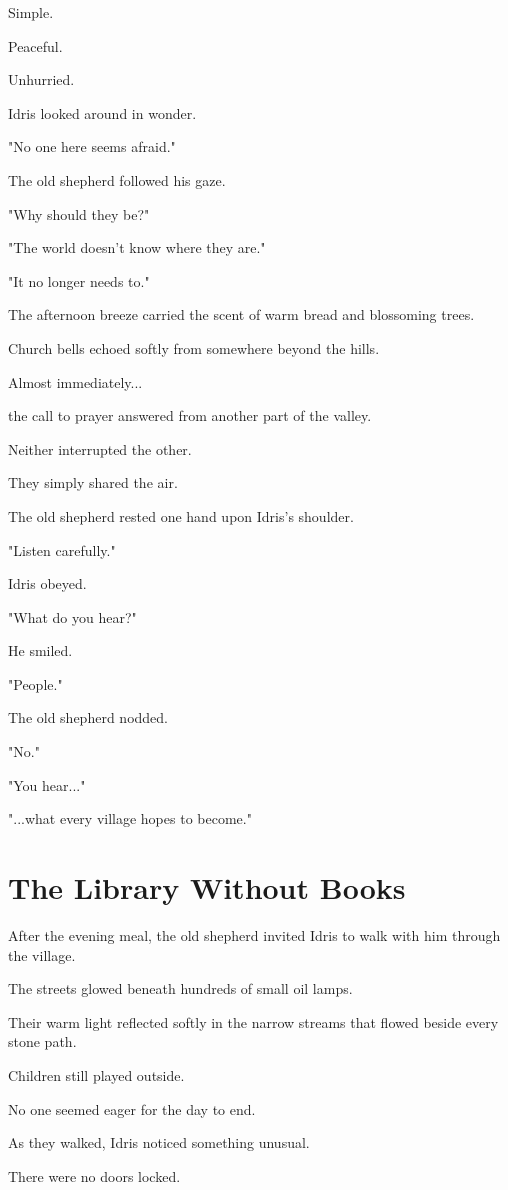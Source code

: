 \documentclass[12pt,openany]{book}
\begin{document}
Simple.

Peaceful.

Unhurried.

Idris looked around in wonder.

"No one here seems afraid."

The old shepherd followed his gaze.

"Why should they be?"

"The world doesn't know where they are."

"It no longer needs to."

The afternoon breeze carried the scent of warm bread and blossoming trees.

Church bells echoed softly from somewhere beyond the hills.

Almost immediately...

the call to prayer answered from another part of the valley.

Neither interrupted the other.

They simply shared the air.

The old shepherd rested one hand upon Idris's shoulder.

"Listen carefully."

Idris obeyed.

"What do you hear?"

He smiled.

"People."

The old shepherd nodded.

"No."

"You hear..."

"...what every village hopes to become."
\section*{The Library Without Books}

After the evening meal, the old shepherd invited Idris to walk with him through the village.

The streets glowed beneath hundreds of small oil lamps.

Their warm light reflected softly in the narrow streams that flowed beside every stone path.

Children still played outside.

No one seemed eager for the day to end.

As they walked, Idris noticed something unusual.

There were no doors locked.
\end{document}

